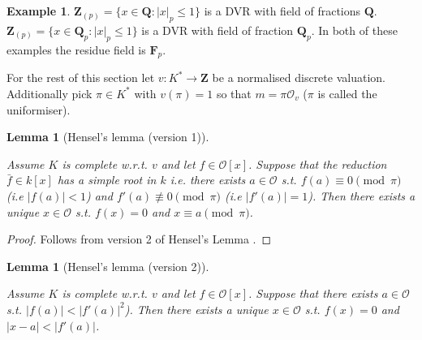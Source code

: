 \documentclass[10pt,]{book}
\newcommand{\lt}{<}
\theoremstyle{plain}
\newtheorem{lemma}[theorem]{Lemma}
\theoremstyle{definition}
\newtheorem{example}[theorem]{Example}
\newcommand{\FF}{\mathbf{F}}
\newcommand{\QQ}{\mathbf{Q}}
\newcommand{\ZZ}{\mathbf{Z}}
\newcommand{\cO}{\mathcal{O}}
\begin{document}
\begin{example}\label{example-4}
\(\ZZ_{(p)} = \{x\in \QQ : |x|_p \le 1\}\) is a DVR with field of fractions \(\QQ\).
            \(\ZZ_{(p)} = \{x\in \QQ_p : |x|_p \le 1\}\) is a DVR with field of fraction \(\QQ_p\).
            In both of these examples the residue field is \(\FF_p\).
          \end{example}
\par

          For the rest of this section let \(v\colon K^* \to \ZZ\) be a normalised discrete valuation.
          Additionally pick \(\pi \in K^*\) with \(v(\pi) = 1\) so that \(m = \pi\cO_v\) (\(\pi\) is called the uniformiser).
\begin{lemma}[Hensel's lemma (version 1)]\label{lemma-8}

            Assume \(K\) is complete w.r.t. \(v\) and let \(f \in \cO[x]\).
            Suppose that the reduction \(\bar{f} \in k[x]\) has a simple root in \(k\) i.e. there exists \(a\in \cO\) s.t. \(f(a) \equiv 0 \pmod{\pi}\) (i.e \(|f(a)| \lt 1\)) and  \(f'(a) \not\equiv 0 \pmod{\pi}\) (i.e \(|f'(a)| = 1\)).
            Then there exists a unique \(x\in \cO\) s.t.
            \(f(x) = 0\) and \(x\equiv a\pmod{\pi}\).
          \end{lemma}
\begin{proof}
Follows from version 2 of Hensel's Lemma .\end{proof}
\begin{lemma}[Hensel's lemma (version 2)]\label{lemma-9}

            Assume \(K\) is complete w.r.t. \(v\) and let \(f \in \cO[x]\).
            Suppose that there exists \(a\in \cO\) s.t. \(|f(a)| \lt |f'(a)|^2\)).
            Then there exists a unique \(x\in \cO\) s.t.
            \(f(x) = 0\) and \(|x-a| \lt |f'(a)|\).
          \end{lemma}
\end{document}
